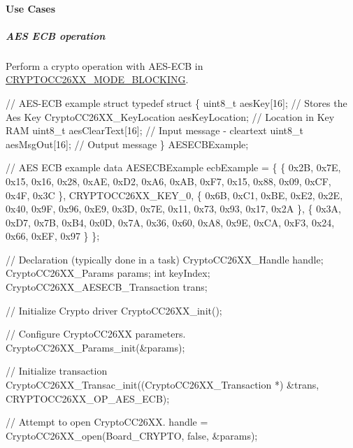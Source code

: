 \paragraph*{Use Cases\label{_crypto_c_c26_x_x_8h_CRYPTO_USE_CASES}%
\hypertarget{_crypto_c_c26_x_x_8h_CRYPTO_USE_CASES}{}%
}

\subparagraph*{A\+E\+S E\+C\+B operation}

Perform a crypto operation with A\+E\+S-\/\+E\+C\+B in \hyperlink{_crypto_c_c26_x_x_8h_abf86c8ac428559f00fed3299d439e2cdaf0a9faf35a12d014c5f3a475906a3373}{C\+R\+Y\+P\+T\+O\+C\+C26\+X\+X\+\_\+\+M\+O\+D\+E\+\_\+\+B\+L\+O\+C\+K\+I\+N\+G}.


\begin{DoxyCode}
\textcolor{comment}{// AES-ECB example struct}
\textcolor{keyword}{typedef} \textcolor{keyword}{struct}
\{
    uint8\_t aesKey[16];                      \textcolor{comment}{// Stores the Aes Key}
    CryptoCC26XX_KeyLocation aesKeyLocation; \textcolor{comment}{// Location in Key RAM}
    uint8\_t aesClearText[16];                \textcolor{comment}{// Input message - cleartext}
    uint8\_t aesMsgOut[16];                   \textcolor{comment}{// Output message}
\} AESECBExample;

\textcolor{comment}{// AES ECB example data}
AESECBExample ecbExample =
\{
    \{ 0x2B, 0x7E, 0x15, 0x16, 0x28, 0xAE, 0xD2, 0xA6,
    0xAB, 0xF7, 0x15, 0x88, 0x09, 0xCF, 0x4F, 0x3C \},
    CRYPTOCC26XX_KEY_0,
    \{ 0x6B, 0xC1, 0xBE, 0xE2, 0x2E, 0x40, 0x9F, 0x96,
    0xE9, 0x3D, 0x7E, 0x11, 0x73, 0x93, 0x17, 0x2A \},
    \{ 0x3A, 0xD7, 0x7B, 0xB4, 0x0D, 0x7A, 0x36, 0x60,
    0xA8, 0x9E, 0xCA, 0xF3, 0x24, 0x66, 0xEF, 0x97 \}
\};

\textcolor{comment}{// Declaration (typically done in a task)}
CryptoCC26XX_Handle             handle;
CryptoCC26XX_Params             params;
\textcolor{keywordtype}{int}                             keyIndex;
CryptoCC26XX_AESECB_Transaction trans;

\textcolor{comment}{// Initialize Crypto driver}
CryptoCC26XX_init();

\textcolor{comment}{// Configure CryptoCC26XX parameters.}
CryptoCC26XX_Params_init(&params);

\textcolor{comment}{// Initialize transaction}
CryptoCC26XX_Transac_init((CryptoCC26XX_Transaction *) &trans, 
      CRYPTOCC26XX_OP_AES_ECB);

\textcolor{comment}{// Attempt to open CryptoCC26XX.}
handle = CryptoCC26XX_open(Board\_CRYPTO, \textcolor{keyword}{false}, &params);


\end{DoxyCode}
